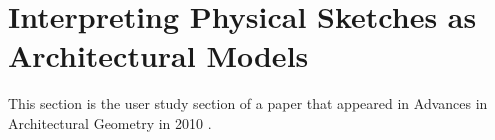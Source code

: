\section{Interpreting Physical Sketches as Architectural Models}  %


This section is the user study section of a paper that appeared in Advances in Architectural Geometry in 2010 \cite{aag201015}.







